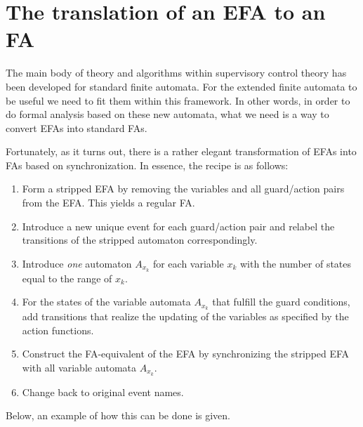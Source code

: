 \documentclass{article}
\begin{document}
\section*{The translation of an EFA to  an FA}
The main body of theory and algorithms within supervisory control
theory has been developed for standard finite automata. For the
extended finite automata to be useful we need to fit them within
this framework. In other words, in order to do formal analysis
based on these new automata, what we need is a way to convert EFAs
into standard FAs.

Fortunately, as it turns out, there is a rather elegant
transformation of EFAs into FAs based on synchronization. In
essence, the recipe is as follows:

\begin{enumerate}
    \item Form a stripped EFA by removing the variables and all
    guard/action pairs from the EFA. This yields a regular FA.
    \item Introduce a new unique event for each guard/action pair and
     relabel the transitions of the stripped automaton correspondingly.
    \item Introduce \emph{one} automaton $A_{x_k}$ for each variable $x_k$ with
    the number of states equal to the range of $x_k$.

    \item
    For the states of the variable automata $A_{x_k}$ that fulfill the guard conditions,
    add transitions that realize the updating of the variables as specified by the action
    functions.

    \item Construct the FA-equivalent of the EFA by synchronizing
    the stripped EFA with all variable automata $A_{x_k}$.
    \item Change back to original event names.
\end{enumerate}


\noindent Below, an example of how this can be done is given.
\end{document}
